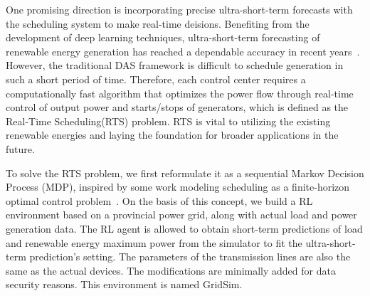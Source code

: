One promising direction is incorporating precise ultra-short-term forecasts with the scheduling system to make real-time deisions.
Benefiting from the development of deep learning techniques, ultra-short-term forecasting of renewable energy generation has reached a dependable accuracy in recent years~\cite{wu2021ultra,tawn2022review}. 
However, the traditional DAS framework is difficult to schedule generation in such a short period of time.
Therefore, each control center requires a computationally fast algorithm that optimizes the power flow through real-time control of output power and starts/stops of generators, which is defined as the Real-Time Scheduling(RTS) problem. 
RTS is vital to utilizing the existing renewable energies and laying the foundation for broader applications in the future.  


To solve the RTS problem, we first reformulate it as a sequential Markov Decision Process (MDP), inspired by some work modeling scheduling as a finite-horizon optimal control problem~\cite{chandy2010simple}. On the basis of this concept, we build a RL environment based on a provincial power grid, along with actual load and power generation data. 
The RL agent is allowed to obtain short-term predictions of load and renewable energy maximum power from the simulator to fit the ultra-short-term prediction's setting. The parameters of the transmission lines are also the same as the actual devices. The modifications are minimally added for data security reasons. This environment is named GridSim. 


